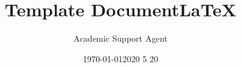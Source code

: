 \documentclass{article}
\title{Template Document}
\author{Academic Support Agent}
\date{\today}
\begin{document}
\maketitle

	\title{LaTeX }	
	\author{ }	
	\institute{ }	
	\date{2020 5 20 }
	\maketitle	
	
	
	
	\begingroup
		\renewcommand*{\addvspace}[1]{}
		\newcommand{\loflabel}{ } 
		\renewcommand{\numberline}[1]{\loflabel~#1\hspace*{1em}}	
		
		
		\newcommand{\lotlabel}{ }
		\renewcommand{\numberline}[1]{\lotlabel~#1\hspace*{1em}}
		
	\endgroup

	
	
	
    \pagestyle{fancy}	%
% 
% 
% 


	
	\renewcommand{\chaptermark}[1]{\markboth{#1}{}}
	\printbibliography	%

\end{document}
